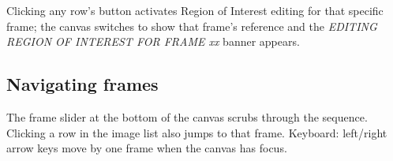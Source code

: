 Clicking any row's button activates Region of Interest editing for
that specific frame; the canvas switches to show that frame's
reference and the \emph{EDITING REGION OF INTEREST FOR FRAME xx}
banner appears.

\subsection{Navigating frames}

The frame slider at the bottom of the canvas scrubs through the
sequence. Clicking a row in the image list also jumps to that frame.
Keyboard: left/right arrow keys move by one frame when the canvas
has focus.
